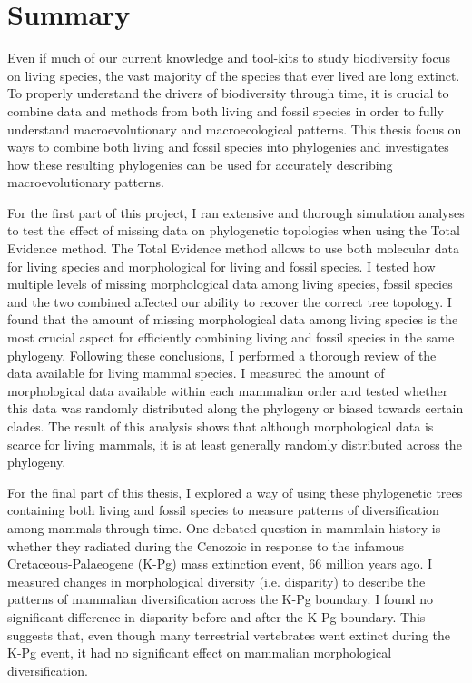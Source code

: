 \chapter*{Summary}

Even if much of our current knowledge and tool-kits to study biodiversity focus on living species, the vast majority of the species that ever lived are long extinct.
To properly understand the drivers of biodiversity through time, it is crucial to combine data and methods from both living and fossil species in order to fully understand macroevolutionary and macroecological patterns.
This thesis focus on ways to combine both living and fossil species into phylogenies and investigates how these resulting phylogenies can be used for accurately describing macroevolutionary patterns.

For the first part of this project, I ran extensive and thorough simulation analyses to test the effect of missing data on phylogenetic topologies when using the Total Evidence method.
The Total Evidence method allows to use both molecular data for living species and morphological for living and fossil species.
I tested how multiple levels of missing morphological data among living species, fossil species and the two combined affected our ability to recover the correct tree topology.
I found that the amount of missing morphological data among living species is the most crucial aspect for efficiently combining living and fossil species in the same phylogeny.
Following these conclusions, I performed a thorough review of the data available for living mammal species.
I measured the amount of morphological data available within each mammalian order and tested whether this data was randomly distributed along the phylogeny or biased towards certain clades.
The result of this analysis shows that although morphological data is scarce for living mammals, it is at least generally randomly distributed across the phylogeny.

For the final part of this thesis, I explored a way of using these phylogenetic trees containing both living and fossil species to measure patterns of diversification among mammals through time.
One debated question in mammlain history is whether they radiated during the Cenozoic in response to the infamous Cretaceous-Palaeogene (K-Pg) mass extinction event, 66 million years ago.
I measured changes in morphological diversity (i.e. disparity) to describe the patterns of mammalian diversification across the K-Pg boundary.
I found no significant difference in disparity before and after the K-Pg boundary.
This suggests that, even though many terrestrial vertebrates went extinct during the K-Pg event, it had no significant effect on mammalian morphological diversification.